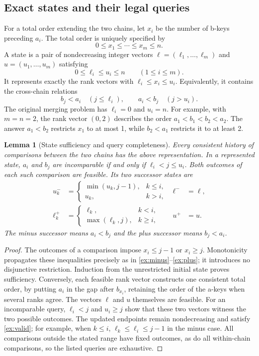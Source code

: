 \documentclass[11pt]{article}
\newtheorem{lemma}[theorem]{Lemma}
\theoremstyle{definition}
\theoremstyle{remark}
\begin{document}
\subsection{Exact states and their legal queries}

For a total order extending the two chains, let $x_i$ be the number of b-keys
preceding $a_i$.  The total order is uniquely specified by
\[
             0\le x_1\le\cdots\le x_m\le n.
\]
A state is a pair of nondecreasing integer vectors
$\ell=(\ell_1,\ldots,\ell_m)$ and $u=(u_1,\ldots,u_m)$ satisfying
\begin{equation}\label{ex:valid}
 0\le\ell_i\le u_i\le n\qquad(1\le i\le m).
\end{equation}
It represents exactly the rank vectors with $\ell_i\le x_i\le u_i$.
Equivalently, it contains the cross-chain relations
\[
 b_j<a_i\quad(j\le\ell_i),\qquad
 a_i<b_j\quad(j>u_i).
\]
The original merging problem has $\ell_i=0$ and $u_i=n$.
For example, with $m=n=2$, the rank vector $(0,2)$ describes
the order $a_1<b_1<b_2<a_2$. The answer $a_1<b_2$ restricts
$x_1$ to at most 1, while $b_2<a_1$ restricts it to at least 2.

\begin{lemma}[State sufficiency and query completeness]\label{ex:state-lemma}
Every consistent history of comparisons between the two chains has the above
representation.  In a represented state, $a_i$ and $b_j$ are incomparable
if and only if $\ell_i<j\le u_i$.  Both outcomes of each such comparison are
feasible.  Its two successor states are
\begin{align}
 u_k^-&=\begin{cases}\min(u_k,j-1),&k\le i,\\u_k,&k>i,\end{cases}
 &\ell^-&=\ell,\label{ex:minus}\\
 \ell_k^+&=\begin{cases}\ell_k,&k<i,\\\max(\ell_k,j),&k\ge i,\end{cases}
 &u^+&=u.\label{ex:plus}
\end{align}
The minus successor means $a_i<b_j$ and the plus successor means $b_j<a_i$.

\end{lemma}
\begin{proof}
The outcomes of a comparison impose $x_i\le j-1$ or $x_i\ge j$.
Monotonicity propagates these inequalities precisely as in
\eqref{ex:minus}--\eqref{ex:plus}; it introduces no disjunctive restriction.
Induction from the unrestricted initial state proves sufficiency.
Conversely, each feasible rank vector constructs one consistent total order,
by putting $a_i$ in the gap after $b_{x_i}$, retaining the order of the a-keys
when several ranks agree.  The vectors $\ell$ and $u$ themselves are feasible.
For an incomparable query, $\ell_i<j$ and $u_i\ge j$ show that these two
vectors witness the two possible outcomes.  The updated endpoints remain
nondecreasing and satisfy \eqref{ex:valid}; for example, when $k\le i$,
$\ell_k\le\ell_i\le j-1$ in the minus case.
All comparisons outside the stated range have fixed outcomes, as do all
within-chain comparisons, so the listed queries are exhaustive.
\end{proof}
\end{document}
